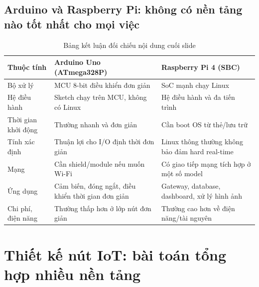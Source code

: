 \subsection{Arduino và Raspberry Pi: không có nền tảng nào tốt nhất cho mọi việc}
\begin{table}[htbp]\centering\small
\caption{Bảng kết luận đối chiếu nội dung cuối slide}
\begin{tabularx}{\textwidth}{p{32mm}XX}
\toprule
Thuộc tính & Arduino Uno (ATmega328P) & Raspberry Pi 4 (SBC)\\\midrule
Bộ xử lý & MCU 8-bit điều khiển đơn giản & SoC mạnh chạy Linux\\
Hệ điều hành & Sketch chạy trên MCU, không có Linux & Hệ điều hành và đa tiến trình\\
Thời gian khởi động & Thường nhanh và đơn giản & Cần boot OS từ thẻ/lưu trữ\\
Tính xác định & Thuận lợi cho I/O định thời đơn giản & Linux thông thường không bảo đảm hard real-time\\
Mạng & Cần shield/module nếu muốn Wi-Fi & Có giao tiếp mạng tích hợp ở một số model\\
Ứng dụng & Cảm biến, đóng ngắt, điều khiển thời gian đơn giản & Gateway, database, dashboard, xử lý hình ảnh\\
Chi phí, điện năng & Thường thấp hơn ở lớp nút đơn giản & Thường cao hơn về điện năng/tài nguyên\\\bottomrule
\end{tabularx}
\end{table}

\section{Thiết kế nút IoT: bài toán tổng hợp nhiều nền tảng}
